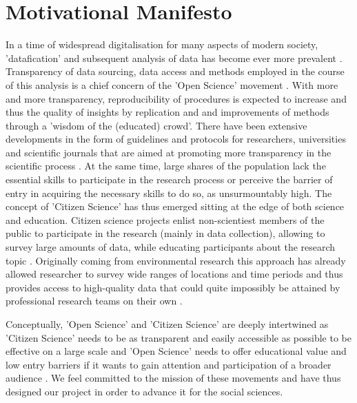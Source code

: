 \documentclass[preprint,12pt,authoryear]{elsarticle}
\begin{document}
	\section{Motivational Manifesto}
	In a time of widespread digitalisation for many aspects of modern society, 'datafication' and subsequent analysis of data has become ever more prevalent \citep{baack_datafication_2015, lycett_datafication:_2013}. Transparency of data sourcing, data access and methods employed in the course of this analysis is a chief concern of the 'Open Science' movement \citep{delfanti_open_2010}. With more and more transparency, reproducibility of procedures is expected to increase and thus the quality of insights by replication and and improvements of methods through a 'wisdom of the (educated) crowd'. There have been extensive developments in the form of guidelines and protocols for researchers, universities and scientific journals that are aimed at promoting more transparency in the scientific process \citep{nosek_promoting_2015, miguel_promoting_2014}. 
	At the same time, large shares of the population lack the essential skills to participate in the research process or perceive the barrier of entry in acquiring the necessary skills to do so, as unsurmountably high. The concept of 'Citizen Science' has thus emerged sitting at the edge of both science and education. Citizen science projects enlist non-scientiest members of the public to participate in the research (mainly in data collection), allowing to survey large amounts of data, while educating participants about the research topic \citep{shirk_public_2012}. Originally coming from environmental research this approach has already allowed researcher to survey wide ranges of locations and time periods and thus provides access to high-quality data that could quite impossibly be attained by professional research teams on their own \citep{bonney_citizen_2009}.
	
	Conceptually, 'Open Science' and 'Citizen Science' are deeply intertwined as 'Citizen Science' needs to be as transparent and easily accessible as possible to be effective on a large scale \citep{nov_dusting_2011} and 'Open Science' needs to offer educational value and low entry barriers if it wants to gain attention and participation of a broader audience \citep{newman_future_2012}. We feel committed to the mission of these movements and have thus designed our project in order to advance it for the social sciences. 
	
\end{document}
